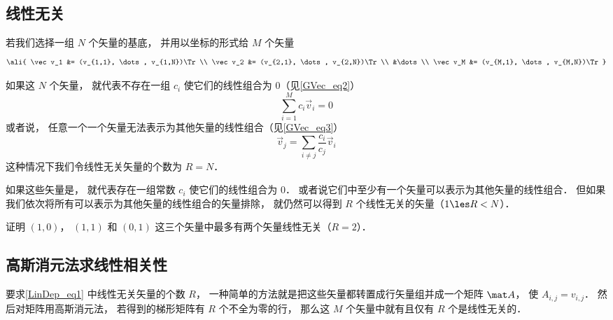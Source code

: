 

\subsection{线性无关}

若我们选择一组 $N$ 个矢量的基底， 并用以坐标的形式给 $M$ 个矢量
\begin{equation}\label{LinDep_eq1}
\ali{
\vec v_1 &= (v_{1,1}, \dots, v_{1,N})\Tr \\
\vec v_2 &= (v_{2,1}, \dots, v_{2,N})\Tr \\
&\dots \\
\vec v_M &= (v_{M,1}, \dots, v_{M,N})\Tr
}\end{equation}

如果这 $N$ 个矢量， 就代表不存在一组 $c_i$ 使它们的线性组合为 0（见\autoref{GVec_eq2}）
\begin{equation}
\sum_{i=1}^M c_i\vec v_i = 0
\end{equation}
或者说， 任意一个一个矢量无法表示为其他矢量的线性组合（见\autoref{GVec_eq3}）%
\begin{equation}
\vec v_j = \sum_{i \ne j}\frac{c_i}{c_j} \vec v_i
\end{equation}
这种情况下我们令线性无关矢量的个数为 $R = N$．

如果这些矢量是， 就代表存在一组常数 $c_i$ 使它们的线性组合为 0． 或者说它们中至少有一个矢量可以表示为其他矢量的线性组合． 但如果我们依次将所有可以表示为其他矢量的线性组合的矢量排除， 就仍然可以得到  $R$ 个线性无关的矢量（$1 \les R < N$）．

\begin{exer}{}
证明 $(1,0)$， $(1,1)$ 和 $(0,1)$ 这三个矢量中最多有两个矢量线性无关（$R = 2$）．
\end{exer}

\subsection{高斯消元法求线性相关性}
要求\autoref{LinDep_eq1} 中线性无关矢量的个数 $R$， 一种简单的方法就是把这些矢量都转置成行矢量组并成一个矩阵 $\mat A$， 使 $A_{i,j} = v_{i,j}$． 然后对矩阵用高斯消元法， 若得到的梯形矩阵有 $R$ 个不全为零的行， 那么这 $M$ 个矢量中就有且仅有 $R$ 个是线性无关的．





 
